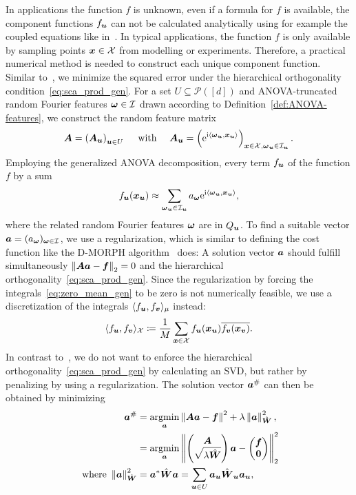 \documentclass{article}
\renewcommand{\vec}[1]{\ensuremath \mathbf{\boldsymbol{#1}}}
\newcommand{\X}{\ensuremath{\mathcal{X}}}
\newcommand{\w}{\ensuremath{\vec \omega}}
\newcommand{\x}{\ensuremath{\vec x}}
\newcommand{\I}{\ensuremath{\mathcal{I}}}
\newcommand{\e}{\mathrm{e}}
\newcommand{\im}{\mathrm{i}}
\DeclareMathOperator*{\argmin}{argmin}
\newcommand{\norm}[1]{\left\lVert {#1} \right\rVert}    %
\theoremstyle{definition}
\numberwithin{equation}{section}
\begin{document}
In applications the function $f$ is unknown, even if a 
formula for $f$ is available, the component functions $f_{\vec u}$ can not be calculated analytically using for example the coupled equations like in~\cite{Ra142}. In typical applications, the function $f$ is only available
by sampling points $\x\in \X$ from modelling or experiments. Therefore, a practical
numerical method is needed to construct each unique component function. Similar to~\cite{LiRa12}, we minimize the squared error under
the hierarchical orthogonality condition~\eqref{eq:sca_prod_gen}.
For a set $U\subseteq \mathcal P([d])$ and ANOVA-truncated random Fourier features $\w\in \I$ drawn according to Definition~\ref{def:ANOVA-features},
we construct the random feature matrix 
\begin{equation}\label{eq:A}
\vec A = \left(\vec A_{\vec u}\right)_{\vec u\in U} \quad \text{ with } \quad \vec A_{\vec u} = \left(\e^{\im \langle \w_{\vec u},\x_{\vec u}\rangle}\right)_{\x\in \X,\w_{\vec u}\in \I_{\vec u}}.
\end{equation}
Employing the generalized ANOVA decomposition, every term $f_{\vec u}$ of the function $f$ by a sum
$$ f_{\vec u}(\x_{\vec u}) \approx \sum_{\w_{\vec u}\in \I_{\vec u}}a_{\w} \e^{\im \langle \w_{\vec u},\x_{\vec u}\rangle},$$
where the related random Fourier features $\w$ are in $Q_{ \vec u}$. 
To find a suitable vector $\vec a=(a_{\w})_{\w \in \I}$, we use a regularization, which is similar to defining the cost function like the D-MORPH algorithm~\cite{LiRa12} does: 
A solution vector $\vec a$ should fulfill simultaneously $\norm{\vec A \vec a -\vec f}_2 = 0$ and the hierarchical orthogonality~\eqref{eq:sca_prod_gen}. Since the regularization by forcing the integrals~\eqref{eq:zero_mean_gen} to be zero is not numerically feasible, we use a discretization of the integrals $\langle f_{\vec u},f_{\vec v}\rangle_{\mu}$ instead:
\begin{equation}\label{eq:sca_prod_X}
\langle f_{\vec u} ,f_{\vec v} \rangle_{\X} \coloneqq \frac{1}{M}\sum_{\vec x\in \X}f_{\vec u} (\x_{\vec u})\overline{f_{\vec v}(\x_{\vec v})}. 
\end{equation}
In contrast to~\cite{LiRa12}, we do not want to enforce the hierarchical orthogonality~\eqref{eq:sca_prod_gen} by calculating an SVD, but rather by penalizing by using a regularization. The solution vector $\vec a^\#$ can then be obtained by minimizing 
\begin{align}\label{eq:lsqr_reg}
\vec a^\# &= \argmin_{\vec a} \norm{\vec A\vec a-\vec f}^2 + \lambda \norm{\vec a }^2_{\hat{\vec W}},\notag\\
& = \argmin_{\vec a} \norm{\begin{pmatrix}\vec A\\ \sqrt{\lambda \hat{\vec W}}\end{pmatrix}\vec a-\begin{pmatrix}\vec f\\ \vec 0\end{pmatrix}}_2^2 \\
\text{ where }\norm{\vec a }^2_{\hat{\vec W}}&=\vec a^* \hat{\vec W}\vec a=\sum_{\vec u\in U}\vec a_{\vec u} \hat{\vec W}_{\vec u}\vec a_{\vec u}, 
\end{align}
\end{document}
